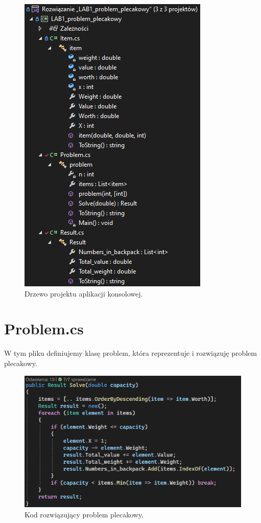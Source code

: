 \documentclass{report}
\begin{document}
\begin{figure}[H]%
	\centering
	\includegraphics[scale=0.6]{zdj/cmd_drzewo}
	\caption{Drzewo projektu aplikacji konsolowej.}
\end{figure}

\section{Problem.cs}

W tym pliku definiujemy klasę problem, która reprezentuje i rozwiązuję problem plecakowy.

\begin{figure}[H]%
	\centering
	\includegraphics[scale=0.6]{zdj/algorytm_zachlanny}
	\caption{Kod rozwiązujący problem plecakowy.}
\end{figure}
\end{document}
